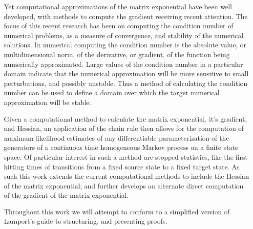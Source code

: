 Yet computational approximations of the matrix exponential have been well developed, with
methods to compute the gradient receiving recent attention. The focus of this recent
research has been on computing the condition number of numerical problems, as a measure of 
convergence, and stability of the numerical solutions\cite{al-mohy_computing_2009}. In
numerical computing the condition number is the absolute value, or multidimensional norm, 
of the derivative, or gradient, of the function being numerically approximated. Large values
of the condition number in a particular domain indicate that the numerical approximation 
will be more sensitive to small perturbations, and possibly unstable. Thus a method of
calculating the condition number can be used to define a domain over which the target 
numerical approximation will be stable.

Given a computational method to calculate the matrix exponential, it's gradient, and
Hessian, an application of the chain rule then allows for the computation of maximum
likelihood estimates of any differentiable parameterization of the generators of a
continuous time homogeneous Markov process on a finite state space. Of particular interest
in such a method are stopped statistics, like the first hitting times of transitions from a
fixed source state to a fixed target state. As such this work extends the current
computational methods to include the Hessian of the matrix exponential; and further develops
an alternate direct computation of the gradient of the matrix exponential.

Throughout this work we will attempt to conform to a simplified version of Lamport's guide
to structuring, and presenting proofs\cite{lamport_how_2012}.
